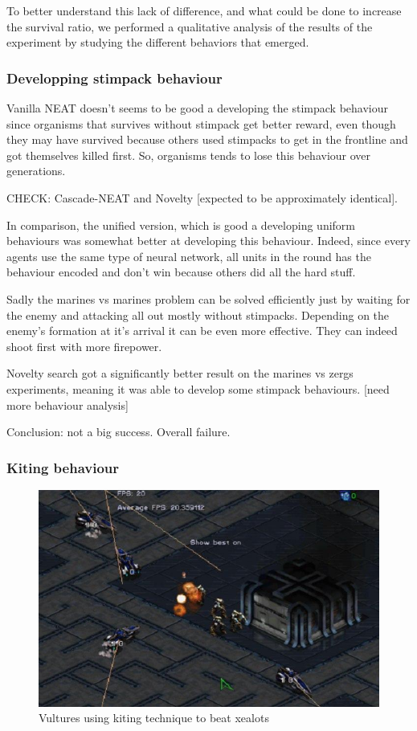 To better understand this lack of difference, and what could be done
to increase the survival ratio, we performed a qualitative analysis of the
results of the experiment by studying the different behaviors that emerged.

\subsubsection{Developping stimpack behaviour}


Vanilla NEAT doesn’t seems to be good a developing the stimpack behaviour since organisms
that survives without stimpack get better reward,
even though they may have survived because others used stimpacks to get in the frontline
and got themselves killed first.
So, organisms tends to lose this behaviour over generations.

CHECK: Cascade-NEAT and Novelty [expected to be approximately identical].

In comparison, the unified version, which is good a developing uniform behaviours
was somewhat better at developing this behaviour.
Indeed, since every agents use the same type of neural network, all units in the round
has the behaviour encoded and don’t win because others
did all the hard stuff.

Sadly the marines vs marines problem can be solved efficiently just by waiting for the
enemy and attacking all out mostly without stimpacks.
Depending on the enemy’s formation at it’s arrival it can be even more effective.
They can indeed shoot first with more firepower.

Novelty search got a significantly better result on the marines vs zergs experiments,
meaning it was able to develop some stimpack behaviours. [need more behaviour analysis]

Conclusion: not a big success. Overall failure.

\subsubsection{Kiting behaviour}

\begin{figure}
    \includegraphics[width=.5\textwidth]{figures/vultures_kiting_screenshot}
    \caption{Vultures using kiting technique to beat xealots}\label{fig:vultures_kiting}
\end{figure}

